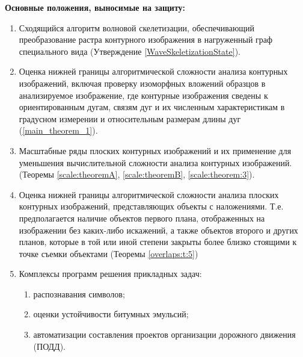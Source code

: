 \textbf{Основные положения, выносимые на защиту:}
\begin{enumerate}

\item Сходящийся алгоритм волновой скелетизации,  обеспечивающий преобразование растра контурного изображения в нагруженный граф специального вида (Утверждение \ref{WaveSkeletizationState}).
\item Оценка нижней границы алгоритмической сложности  анализа контурных изображений, включая проверку изоморфных вложений образцов в анализируемое изображение, где контурные изображения сведены к ориентированным дугам, связям дуг и их численным характеристикам в градусном измерении и  относительным размерам  длины дуг  (\ref{main_theorem_1}).
\item Масштабные ряды плоских контурных изображений и их применение для уменьшения  вычислительной сложности анализа контурных изображений.  (Теоремы \ref{scale:theoremA}, \ref{scale:theoremB}, \ref{scale:theorem:3}).
\item Оценка нижней границы алгоритмической сложности  анализа  плоских контурных изображений, представляющих объекты с наложениями. Т.е. предполагается наличие объектов первого плана, отображенных на изображении без каких-либо искажений,  а также объектов второго и других планов, которые в той или иной степени закрыты более близко стоящими к точке съемки объектами (Теоремы \ref{overlaps:t:5})
\item Комплексы программ  решения прикладных задач:
	\begin{enumerate}
	\item распознавания символов;
	\item оценки устойчивости битумных эмульсий;
	\item автоматизации составления проектов организации дорожного движения (ПОДД). 
	\end{enumerate}   
\end{enumerate}
   
